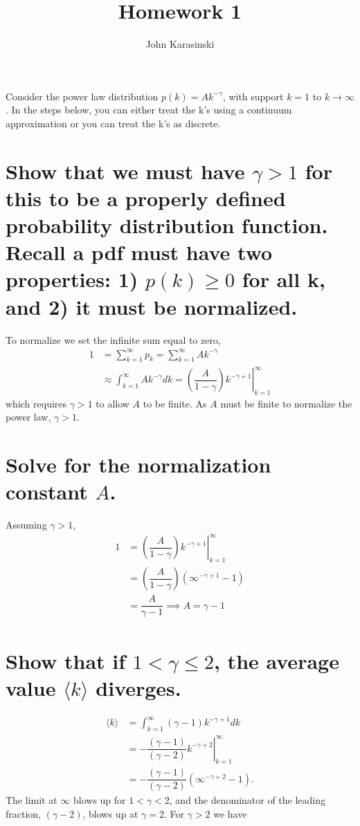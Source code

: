\documentclass[onecolumn,10pt]{jhwhw}
\author{John Karasinski}
\title{Homework 1}
\begin{document}


Consider the power law distribution $p(k) = Ak^{-\gamma}$, with support $k = 1$ to $k \rightarrow \infty$. In the steps below, you can either treat the k's using a continuum approximation or you can treat the k's as discrete.

\part{Show that we must have $\gamma > 1$ for this to be a properly defined probability distribution function. Recall a pdf must have two properties: 1) $p(k) \geq 0$ for all k, and 2) it must be normalized.}

To normalize we set the infinite sum equal to zero,
\begin{align*}
1 &= \sum_{k=1}^{\infty} p_k = \sum_{k=1}^{\infty} A k^{-\gamma} \\
  &\approx \int_{k=1}^{\infty} A k^{-\gamma} dk = \left. \left( \dfrac{A}{1 - \gamma} \right) k^{-\gamma + 1} \right |_{k=1}^{\infty}
\end{align*}
which requires $\gamma > 1$ to allow $A$ to be finite. As $A$ must be finite to normalize the power law, $\gamma > 1$.

\part{Solve for the normalization constant $A$.}
Assuming $\gamma > 1$,
\begin{align*}
1 &= \left. \left( \dfrac{A}{1 - \gamma} \right) k^{-\gamma + 1} \right |_{k=1}^{\infty} \\
   &= \left( \dfrac{A}{1 - \gamma} \right) \left( \infty^{-\gamma+1} - 1 \right) \\
   &= \dfrac{A}{\gamma - 1} \implies \boxed{A = \gamma - 1}
\end{align*}

\part{Show that if $1 < \gamma \leq 2$, the average value $\langle k \rangle$ diverges.}

\begin{align*}
\langle k \rangle &= \int_{k=1}^{\infty} (\gamma - 1) k^{-\gamma+1} dk \\
                  &= \left. -\dfrac{(\gamma - 1)}{(\gamma - 2)} k^{-\gamma+2} \right |_{k=1}^{\infty} \\
                  &= -\dfrac{(\gamma - 1)}{(\gamma - 2)} \left(\infty^{-\gamma+2} - 1 \right).
\end{align*}
The limit at $\infty$ blows up for $1 < \gamma < 2$, and the denominator of the leading fraction, $(\gamma - 2)$, blows up at $\gamma = 2$. For $\gamma > 2$ we have
\end{document}
